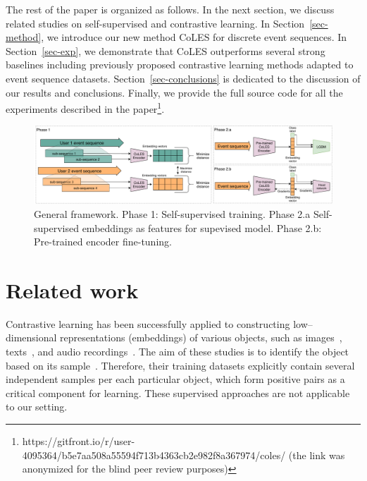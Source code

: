 \documentclass[sigconf, anonymous]{acmart}
\begin{document}
The rest of the paper is organized as follows. In the next section, we discuss related studies on self-supervised and contrastive learning. In Section~\ref{sec-method}, we introduce our new method CoLES for discrete event sequences. In Section~\ref{sec-exp}, we demonstrate that CoLES outperforms several strong baselines including previously proposed contrastive learning methods adapted to event sequence datasets. Section~\ref{sec-conclusions} is dedicated to the discussion of our results and conclusions.
Finally, we provide the full source code for all the experiments described in the paper\footnote{
https://gitfront.io/r/user-4095364/b5e7aa508a55594f713b4363cb2e982f8a367974/coles/ (the link was anonymized for the blind peer review purposes)}.

\begin{figure}[htbp]
  \includegraphics[width=\linewidth]{figures/CoLES.pdf}
\caption{General framework. Phase 1: Self-supervised training. Phase 2.a Self-supervised embeddings as features for supevised model. Phase 2.b: Pre-trained encoder fine-tuning. }
  \label{fig-arch}
\end{figure}

\section{Related work} \label{sec-rel-work}

Contrastive learning has been successfully applied to constructing low--dimensional representations (embeddings) of various objects, such as images~\citep{Chopra2005LearningAS, Schroff2015FaceNetAU}, texts~\citep{Reimers2019SentenceBERTSE}, and audio recordings~\citep{Wan2018GeneralizedEL}.
The aim of these studies is to identify the object based on its sample~\citep{Schroff2015FaceNetAU, Hu2014DiscriminativeDM, Wan2018GeneralizedEL}. Therefore, their training datasets explicitly contain several independent samples per each particular object, which form positive pairs as a critical component for learning. These supervised approaches are not applicable to our setting.
\end{document}
